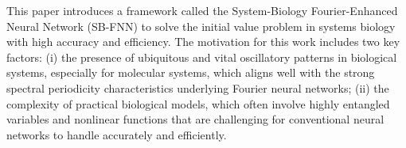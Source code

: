 

This paper introduces a framework called the System-Biology Fourier-Enhanced Neural Network (SB-FNN) to solve the initial value problem in systems biology with high accuracy and efficiency. The motivation for this work includes two key factors: (i) the presence of ubiquitous and vital oscillatory patterns in biological systems, especially for molecular systems, which aligns well with the strong spectral periodicity characteristics underlying Fourier neural networks; (ii) the complexity of practical biological models, which often involve highly entangled variables and nonlinear functions that are challenging for conventional neural networks to handle accurately and efficiently.


